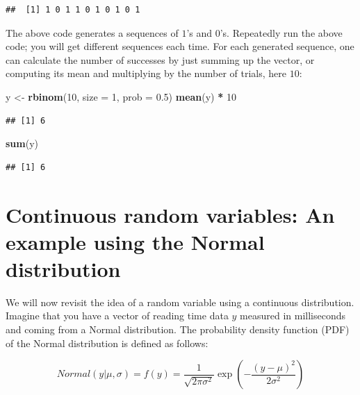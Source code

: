\documentclass[12pt,]{krantz}
\newenvironment{Shaded}{\begin{snugshade}}{\end{snugshade}}
\newcommand{\DataTypeTok}[1]{\textcolor[rgb]{0.13,0.29,0.53}{#1}}
\newcommand{\DecValTok}[1]{\textcolor[rgb]{0.00,0.00,0.81}{#1}}
\newcommand{\FloatTok}[1]{\textcolor[rgb]{0.00,0.00,0.81}{#1}}
\newcommand{\KeywordTok}[1]{\textcolor[rgb]{0.13,0.29,0.53}{\textbf{#1}}}
\newcommand{\NormalTok}[1]{#1}
\newcommand{\OperatorTok}[1]{\textcolor[rgb]{0.81,0.36,0.00}{\textbf{#1}}}
\newcommand{\StringTok}[1]{\textcolor[rgb]{0.31,0.60,0.02}{#1}}
\begin{document}
\begin{verbatim}
##  [1] 1 0 1 1 0 1 0 1 0 1
\end{verbatim}

The above code generates a sequences of \(1\)'s and \(0\)'s. Repeatedly run the above code; you will get different sequences each time. For each generated sequence, one can calculate the number of successes by just summing up the vector, or computing its mean and multiplying by the number of trials, here \(10\):

\begin{Shaded}
\begin{Highlighting}[]
\NormalTok{y <-}\StringTok{ }\KeywordTok{rbinom}\NormalTok{(}\DecValTok{10}\NormalTok{, }\DataTypeTok{size =} \DecValTok{1}\NormalTok{, }\DataTypeTok{prob =} \FloatTok{0.5}\NormalTok{)}
\KeywordTok{mean}\NormalTok{(y) }\OperatorTok{*}\StringTok{ }\DecValTok{10}
\end{Highlighting}
\end{Shaded}

\begin{verbatim}
## [1] 6
\end{verbatim}

\begin{Shaded}
\begin{Highlighting}[]
\KeywordTok{sum}\NormalTok{(y)}
\end{Highlighting}
\end{Shaded}

\begin{verbatim}
## [1] 6
\end{verbatim}

\hypertarget{continuous-random-variables-an-example-using-the-normal-distribution}{%
\section{Continuous random variables: An example using the Normal distribution}\label{continuous-random-variables-an-example-using-the-normal-distribution}}

We will now revisit the idea of a random variable using a continuous distribution. Imagine that you have a vector of reading time data \(y\) measured in milliseconds and coming from a Normal distribution. The probability density function (PDF) of the Normal distribution is defined as follows:

\begin{equation}
Normal(y|\mu,\sigma)=f(y)= \frac{1}{\sqrt{2\pi \sigma^2}} \exp \left(-\frac{(y-\mu)^2}{2\sigma^2} \right)
\end{equation}
\end{document}
